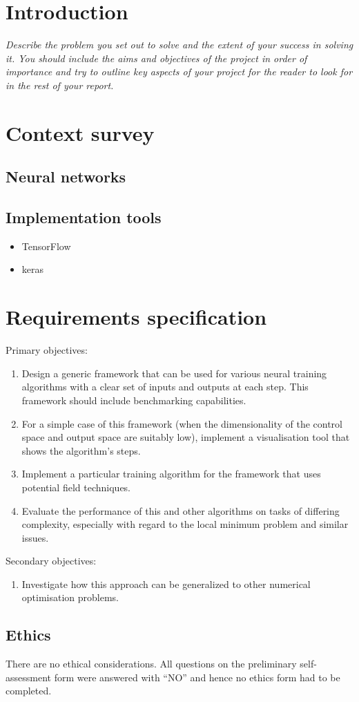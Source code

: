 \chapter{Introduction}
\textit{Describe the problem you set out to solve and the
extent of your success in solving it. You should include
the aims and objectives of the project in order of
importance and try to outline key aspects of your
project for the reader to look for in the rest of your
report.}
\todo

\chapter{Context survey}
\section{Neural networks}
\todo
\section{Implementation tools}
\begin{itemize}
    \item TensorFlow
    \item keras
\end{itemize}
\todo

\chapter{Requirements specification}
Primary objectives:
\begin{enumerate}
    \item Design a generic framework that can be used for various neural training algorithms
    with a clear set of inputs and outputs at each step. This framework should include
    benchmarking capabilities.
    \item For a simple case of this framework (when the dimensionality of the control space
    and output space are suitably low), implement a visualisation tool that shows the
    algorithm’s steps.
    \item Implement a particular training algorithm for the framework that uses potential field
    techniques.
    \item Evaluate the performance of this and other algorithms on tasks of differing
    complexity, especially with regard to the local minimum problem and similar issues.
\end{enumerate}
Secondary objectives:
\begin{enumerate}
    \item Investigate how this approach can be generalized to other numerical optimisation problems.
\end{enumerate}

\section{Ethics}
There are no ethical considerations. 
All questions on the preliminary self-assessment form were answered with ``NO'' and hence no ethics form had to be completed.
